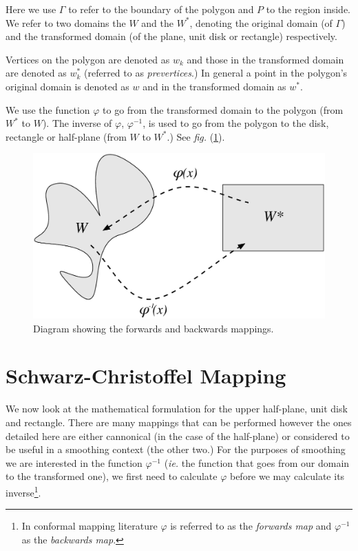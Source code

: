 \documentclass[a4paper,10pt]{amsart}
\newcommand{\sch}{Schwarz-Christoffel }
\newcommand{\fig}[1]{\emph{fig.} (\ref{#1})}
\renewcommand{\phi}{\varphi}
\begin{document}
Here we use $\Gamma$ to refer to the boundary of the polygon and $P$ to the region inside. We refer to two domains the $W$ and the $W^*$, denoting the original domain (of $\Gamma$) and the transformed domain (of the plane, unit disk or rectangle) respectively. 

Vertices on the polygon are denoted as $w_k$ and those in the transformed domain are denoted as $w^*_k$ (referred to as \emph{prevertices}.) In general a point in the polygon's original domain is denoted as $w$ and in the transformed domain as $w^*$.

We use the function $\phi$ to go from the transformed domain to the polygon (from $W^*$ to $W$). The inverse of $\phi$, $\phi^{-1}$, is used to go from the polygon to the disk, rectangle or half-plane (from $W$ to $W^*$.)  See \fig{mappingdia}.

\begin{figure} [tbp]
\centering
\includegraphics[scale=0.5]{figs/mappingdia.pdf}
\caption{Diagram showing the forwards and backwards mappings.}
\label{mappingdia}
\end{figure}


\section{\sch Mapping}

We now look at the mathematical formulation for the upper half-plane, unit disk and rectangle. There are many mappings that can be performed however the ones detailed here are either cannonical (in the case of the half-plane) or considered to be useful in a smoothing context (the other two.) For the purposes of smoothing we are interested in the function $\phi^{-1}$ (\emph{ie.} the function that goes from our domain to the transformed one), we first need to calculate $\phi$ before we may calculate its inverse\footnote{In conformal mapping literature $\phi$ is referred to as the \emph{forwards map} and $\phi^{-1}$ as the \emph{backwards map}.}.
\end{document}
